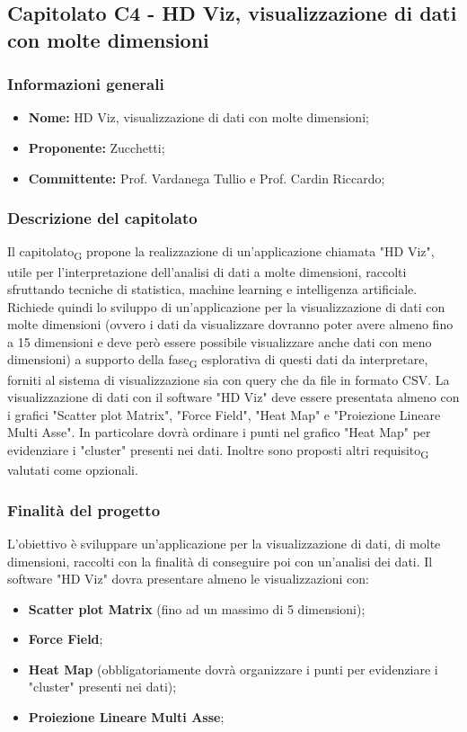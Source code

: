 \subsection{Capitolato C4 - HD Viz, visualizzazione di dati con molte dimensioni}
\subsubsection{Informazioni generali}
	\begin{itemize}
	\item \textbf{Nome:} HD Viz, visualizzazione di dati con molte dimensioni;
	\item \textbf{Proponente:} Zucchetti;
	\item \textbf{Committente:}  Prof. Vardanega Tullio e Prof. Cardin Riccardo;
	\end{itemize}
\subsubsection{Descrizione del capitolato}
Il capitolato\textsubscript{G} propone la realizzazione di un'applicazione chiamata "HD Viz", utile per l'interpretazione dell'analisi di dati a molte dimensioni, raccolti sfruttando tecniche di statistica, machine learning e intelligenza artificiale.
Richiede quindi lo sviluppo di un'applicazione per la visualizzazione di dati con molte dimensioni (ovvero i dati da visualizzare dovranno poter avere almeno fino a 15 dimensioni e deve però essere possibile visualizzare anche dati con meno dimensioni) a supporto della fase\textsubscript{G} esplorativa di questi dati da interpretare, forniti al sistema di visualizzazione sia con query che da file in formato CSV.
La visualizzazione di dati con il software "HD Viz" deve essere presentata almeno con i grafici "Scatter plot Matrix", "Force Field", "Heat Map" e "Proiezione Lineare Multi Asse". In particolare dovrà ordinare i punti nel grafico "Heat Map" per evidenziare i "cluster" presenti nei dati.
Inoltre sono proposti altri requisito\textsubscript{G} valutati come opzionali.
\subsubsection{Finalità del progetto}
L'obiettivo è sviluppare un'applicazione per la visualizzazione di dati, di molte dimensioni, raccolti con la finalità di conseguire poi con un'analisi dei dati.
Il software "HD Viz" dovra presentare almeno le visualizzazioni con:
\begin{itemize}
\item \textbf{Scatter plot Matrix} (fino ad un massimo di 5 dimensioni);
\item \textbf{Force Field};
\item \textbf{Heat Map} (obbligatoriamente dovrà organizzare i punti per evidenziare i "cluster" presenti nei dati);
\item \textbf{Proiezione Lineare Multi Asse};
\end{itemize}

